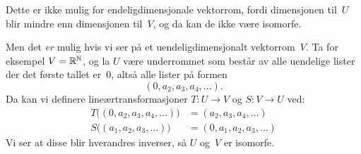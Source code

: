 \begin{losning}
Dette er ikke mulig for endeligdimensjonale vektorrom, fordi
dimensjonen til~$U$ blir mindre enn dimensjonen til~$V$, og da kan de
ikke være isomorfe.

Men det \emph{er} mulig hvis vi ser på et uendeligdimensjonalt
vektorrom~$V$.  Ta for eksempel $V = \mathbb{R}^{\mathbb{N}}$, og la $U$ være
underrommet som består av alle uendelige lister der det første tallet
er~$0$, altså alle lister på formen
\[
(0, a_2, a_3, a_4, \ldots ).
\]
Da kan vi definere lineærtransformasjoner $T \colon U \to V$ og
$S \colon V \to U$ ved:
\begin{align*}
T\big( (0, a_2, a_3, a_4, \ldots) \big)
&= (a_2, a_3, a_4, \ldots) \\
S\big( (a_1, a_2, a_3, \ldots) \big)
&= (0, a_1, a_2, a_3, \ldots)
\end{align*}
Vi ser at disse blir hverandres inverser, så $U$ og~$V$ er isomorfe.
\end{losning}
